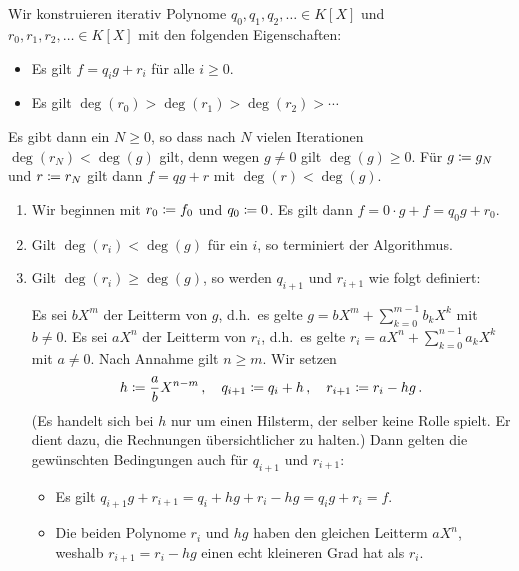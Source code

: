 \section{}

Wir konstruieren iterativ Polynome $q_0, q_1, q_2, \dotsc \in K[X]$ und $r_0, r_1, r_2, \dotsc \in K[X]$ mit den folgenden Eigenschaften:
\begin{itemize}
  \item
    Es gilt $f = q_i g + r_i$ für alle $i \geq 0$.
  \item
    Es gilt $\deg(r_0) > \deg(r_1) > \deg(r_2) > \dotsb$
\end{itemize}
Es gibt dann ein $N \geq 0$, so dass nach $N$ vielen Iterationen $\deg(r_N) < \deg(g)$ gilt, denn wegen $g \neq 0$ gilt $\deg(g) \geq 0$.
Für $g \coloneqq g_N$ und $r \coloneqq r_N$ gilt dann $f = qg + r$ mit $\deg(r) < \deg(g)$.

\begin{enumerate}
  \item
    Wir beginnen mit $r_0 \coloneqq f_0$ und $q_0 \coloneqq 0$.
    Es gilt dann $f = 0 \cdot g + f = q_0 g + r_0$.
  \item
    Gilt $\deg(r_i) < \deg(g)$ für ein $i$, so terminiert der Algorithmus.
  \item
    Gilt $\deg(r_i) \geq \deg(g)$, so werden $q_{i+1}$ und $r_{i+1}$ wie folgt definiert:
    
    Es sei $b X^m$ der Leitterm von $g$, d.h.\ es gelte $g = b X^m + \sum_{k=0}^{m-1} b_k X^k$ mit $b \neq 0$.
    Es sei $a X^n$ der Leitterm von $r_i$, d.h.\ es gelte $r_i = a X^n + \sum_{k=0}^{n-1} a_k X^k$ mit $a \neq 0$.
    Nach Annahme gilt $n \geq m$.
    Wir setzen
    \begin{align*}
      h       \coloneqq \frac{a}{b} X^{n-m} \,,
      \quad
      q_{i+1} \coloneqq q_i + h \,,
      \quad
      r_{i+1} \coloneqq r_i - h g \,.
    \end{align*}
    (Es handelt sich bei $h$ nur um einen Hilsterm, der selber keine Rolle spielt.
    Er dient dazu, die Rechnungen übersichtlicher zu halten.)
    Dann gelten die gewünschten Bedingungen auch für $q_{i+1}$ und $r_{i+1}$:
    \begin{itemize}
      \item
        Es gilt $q_{i+1} g + r_{i+1} = q_i + h g + r_i - h g = q_i g + r_i = f$.
      \item
        Die beiden Polynome $r_i$ und $h g$ haben den gleichen Leitterm $a X^n$, weshalb $r_{i+1} = r_i - h g$ einen echt kleineren Grad hat als $r_i$.
    \end{itemize}
\end{enumerate}


